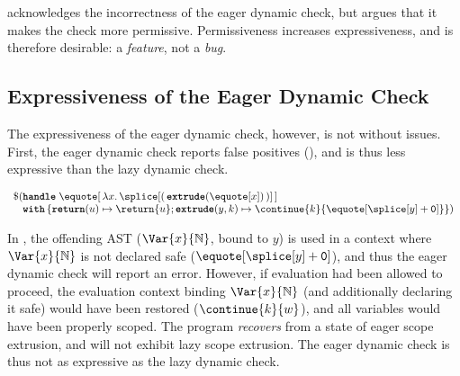 
\citet{kiselyov-14} acknowledges the incorrectness of the eager dynamic check, but argues that it makes the check more permissive. Permissiveness increases expressiveness, and is therefore desirable: a \textit{feature}, not a \textit{bug}. 

\subsection{Expressiveness of the Eager Dynamic Check}\label{subsection:eager-dynamic-expressiveness}
The expressiveness of the eager dynamic check, however, is not without issues. First, the eager dynamic check reports false positives (), and is thus less expressive than the lazy dynamic check.

\begin{code} 
 \begin{source}
  $\begin{array}{l}
      \$ (\textbf{\texttt{handle}} \; \equote[\, {\lambda x. \, {\splice[(\, {{\textbf{\texttt{extrude}}(\equote[x])}} \, )]}}\,] \\
      \;\;\,\,\textbf{\texttt{with}} \, \{ \textbf{\texttt{return}}(u) \mapsto {\return{u}}; \textbf{\texttt{extrude}}(y, k) \mapsto {{\continue{k}{\equote[{\splice[y]} + \texttt{0}]}}}\})
    \end{array}$
 \end{source}
 \label{listing:eager-scope-extrusion-looks-unsafe}
\end{code}

In , the offending AST ($\Var{x}{\mathbb{N}}$, bound to $y$) is used in a context where $\Var{x}{\mathbb{N}}$ is not declared safe ($\equote[{\splice[y]} + \texttt{0}]$), and thus the eager dynamic check will report an error. However, if evaluation had been allowed to proceed, the evaluation context binding $\Var{x}{\mathbb{N}}$ (and additionally declaring it safe) would have been restored ($\continue{k}{w}$), and all variables would have been properly scoped. The program \textit{recovers} from a state of eager scope extrusion, and will not exhibit lazy scope extrusion. The eager dynamic check is thus not as expressive as the lazy dynamic check.

